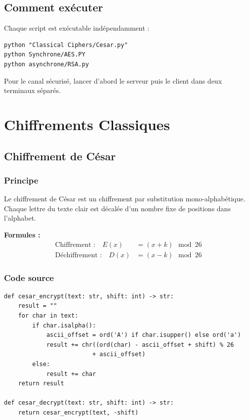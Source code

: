 \documentclass[12pt,a4paper]{report}
\begin{document}
\section{Comment exécuter}
Chaque script est exécutable indépendamment :
\begin{lstlisting}[style=python,title=Exécution d'un script]
python "Classical Ciphers/Cesar.py"
python Synchrone/AES.PY
python asynchrone/RSA.py
\end{lstlisting}
Pour le canal sécurisé, lancer d'abord le serveur puis le client dans deux terminaux séparés.

\chapter{Chiffrements Classiques}

\section{Chiffrement de César}

\subsection{Principe}
Le chiffrement de César est un chiffrement par substitution mono-alphabétique. Chaque lettre du texte clair est décalée d'un nombre fixe de positions dans l'alphabet.

\textbf{Formules :}
\begin{align}
\text{Chiffrement :} \quad E(x) &= (x + k) \mod 26 \\
\text{Déchiffrement :} \quad D(x) &= (x - k) \mod 26
\end{align}

\subsection{Code source}
\begin{lstlisting}[style=python,caption=Cesar.py - Fonctions principales]
def cesar_encrypt(text: str, shift: int) -> str:
    result = ""
    for char in text:
        if char.isalpha():
            ascii_offset = ord('A') if char.isupper() else ord('a')
            result += chr((ord(char) - ascii_offset + shift) % 26
                         + ascii_offset)
        else:
            result += char
    return result

def cesar_decrypt(text: str, shift: int) -> str:
    return cesar_encrypt(text, -shift)
\end{lstlisting}
\end{document}

